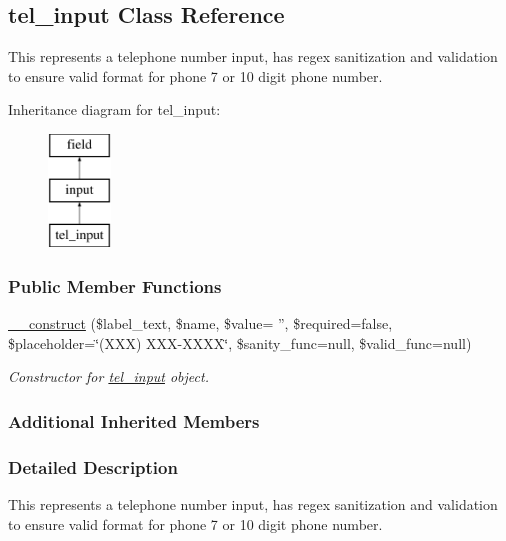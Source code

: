\hypertarget{classtel__input}{\subsection{tel\-\_\-input Class Reference}
\label{classtel__input}
}


This represents a telephone number input, has regex sanitization and validation to ensure valid format for phone 7 or 10 digit phone number.  


Inheritance diagram for tel\-\_\-input\-:\begin{figure}[H]
\begin{center}
\leavevmode
\includegraphics[height=3.000000cm]{classtel__input}
\end{center}
\end{figure}
\subsubsection*{Public Member Functions}
\begin{DoxyCompactItemize}
\item 
\hyperlink{classtel__input_aac420f3bfa98941083dbb0e2c54b19ab}{\-\_\-\-\_\-construct} (\$label\-\_\-text, \$name, \$value= '', \$required=false, \$placeholder=\char`\"{}(X\-X\-X) X\-X\-X-\/X\-X\-X\-X\char`\"{}, \$sanity\-\_\-func=null, \$valid\-\_\-func=null)
\begin{DoxyCompactList}\small\item\em Constructor for \hyperlink{classtel__input}{tel\-\_\-input} object. \end{DoxyCompactList}\end{DoxyCompactItemize}
\subsubsection*{Additional Inherited Members}


\subsubsection{Detailed Description}
This represents a telephone number input, has regex sanitization and validation to ensure valid format for phone 7 or 10 digit phone number. 

